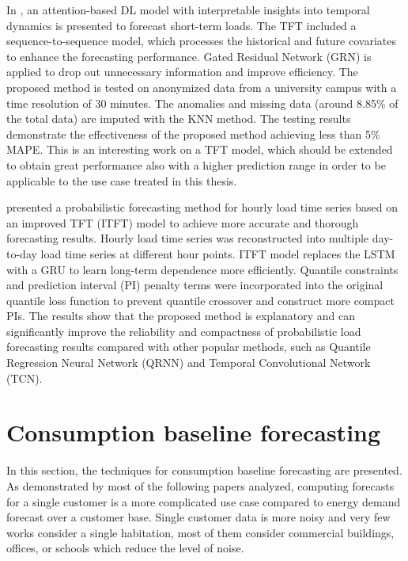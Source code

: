 In \cite{10033079}, an attention-based DL model with interpretable insights into temporal dynamics is presented to forecast short-term loads.
The TFT included a sequence-to-sequence model, which processes the historical and future covariates to enhance the forecasting performance.
Gated Residual Network (GRN) is applied to drop out unnecessary information and improve efficiency.
The proposed method is tested on anonymized data from a university campus with a time resolution of 30 minutes.
The anomalies and missing data (around 8.85\% of the total data) are imputed with the KNN method.
The testing results demonstrate the effectiveness of the proposed method achieving less than 5\% MAPE.
This is an interesting work on a TFT model, which should be extended to obtain great performance also with a higher prediction range in order to be applicable to the use case treated in this thesis.

\cite{LI2023108743} presented a probabilistic forecasting method for hourly load time series based on an improved TFT (ITFT) model to achieve more accurate and thorough forecasting results.
Hourly load time series was reconstructed into multiple day-to-day load time series at different hour points.
ITFT model replaces the LSTM with a GRU to learn long-term dependence more efficiently.
Quantile constraints and prediction interval (PI) penalty terms were incorporated into the original quantile loss function to prevent quantile crossover and construct more compact PIs.
The results show that the proposed method is explanatory and can significantly improve the reliability and compactness of probabilistic load forecasting results compared with other popular methods, such as Quantile Regression Neural Network (QRNN) and Temporal Convolutional Network (TCN).


\section{Consumption baseline forecasting}
\label{sec:baselinesoa}
\vspace{0.2 cm}

In this section, the techniques for consumption baseline forecasting are presented.
As demonstrated by most of the following papers analyzed, computing forecasts for a single customer is a more complicated use case compared to energy demand forecast over a customer base.
Single customer data is more noisy and very few works consider a single habitation, most of them consider commercial buildings, offices, or schools which reduce the level of noise.

